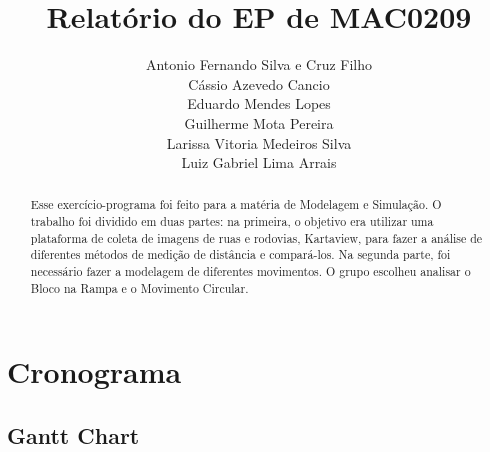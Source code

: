 \documentclass{article}
\title{Relatório do EP de MAC0209}
\author{
    Antonio Fernando Silva e Cruz Filho\\
    Cássio Azevedo Cancio\\
    Eduardo Mendes Lopes\\
    Guilherme Mota Pereira\\
    Larissa Vitoria Medeiros Silva\\
    Luiz Gabriel Lima Arrais
}
\begin{document}
\maketitle


\begin{abstract}
Esse exercício-programa foi feito para a matéria de Modelagem e Simulação. O trabalho foi dividido em duas partes: na primeira, o objetivo era utilizar uma plataforma de coleta de imagens de ruas e rodovias, Kartaview, para fazer a análise de diferentes métodos de medição de distância e compará-los. Na segunda parte, foi necessário fazer a modelagem de diferentes movimentos. O grupo escolheu analisar o Bloco na Rampa e o Movimento Circular.
\end{abstract}

\newpage

\tableofcontents

\newpage

\section{Cronograma}

\subsection{Gantt Chart}
\end{document}
